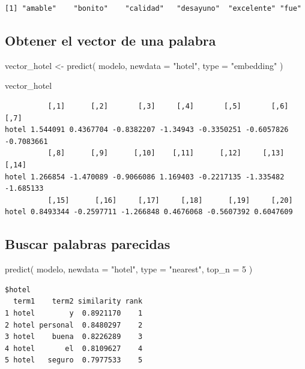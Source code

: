 \documentclass[
  letterpaper,
  DIV=11,
  numbers=noendperiod]{scrreprt}
\newenvironment{Shaded}{\begin{snugshade}}{\end{snugshade}}
\newcommand{\AttributeTok}[1]{\textcolor[rgb]{0.40,0.45,0.13}{#1}}
\newcommand{\DecValTok}[1]{\textcolor[rgb]{0.68,0.00,0.00}{#1}}
\newcommand{\FunctionTok}[1]{\textcolor[rgb]{0.28,0.35,0.67}{#1}}
\newcommand{\NormalTok}[1]{\textcolor[rgb]{0.00,0.23,0.31}{#1}}
\newcommand{\OtherTok}[1]{\textcolor[rgb]{0.00,0.23,0.31}{#1}}
\newcommand{\StringTok}[1]{\textcolor[rgb]{0.13,0.47,0.30}{#1}}
\begin{document}
\begin{verbatim}
[1] "amable"    "bonito"    "calidad"   "desayuno"  "excelente" "fue"      
\end{verbatim}

\subsection{Obtener el vector de una
palabra}\label{obtener-el-vector-de-una-palabra}

\begin{Shaded}
\begin{Highlighting}[]
\NormalTok{vector\_hotel }\OtherTok{\textless{}{-}} \FunctionTok{predict}\NormalTok{(}
\NormalTok{  modelo,}
  \AttributeTok{newdata =} \StringTok{"hotel"}\NormalTok{,}
  \AttributeTok{type =} \StringTok{"embedding"}
\NormalTok{)}

\NormalTok{vector\_hotel}
\end{Highlighting}
\end{Shaded}

\begin{verbatim}
          [,1]      [,2]       [,3]     [,4]       [,5]       [,6]       [,7]
hotel 1.544091 0.4367704 -0.8382207 -1.34943 -0.3350251 -0.6057826 -0.7083661
          [,8]      [,9]      [,10]    [,11]      [,12]     [,13]     [,14]
hotel 1.266854 -1.470089 -0.9066086 1.169403 -0.2217135 -1.335482 -1.685133
          [,15]      [,16]     [,17]     [,18]      [,19]     [,20]
hotel 0.8493344 -0.2597711 -1.266848 0.4676068 -0.5607392 0.6047609
\end{verbatim}

\subsection{Buscar palabras parecidas}\label{buscar-palabras-parecidas}

\begin{Shaded}
\begin{Highlighting}[]
\FunctionTok{predict}\NormalTok{(}
\NormalTok{  modelo,}
  \AttributeTok{newdata =} \StringTok{"hotel"}\NormalTok{,}
  \AttributeTok{type =} \StringTok{"nearest"}\NormalTok{,}
  \AttributeTok{top\_n =} \DecValTok{5}
\NormalTok{)}
\end{Highlighting}
\end{Shaded}

\begin{verbatim}
$hotel
  term1    term2 similarity rank
1 hotel        y  0.8921170    1
2 hotel personal  0.8480297    2
3 hotel    buena  0.8226289    3
4 hotel       el  0.8109627    4
5 hotel   seguro  0.7977533    5
\end{verbatim}
\end{document}
